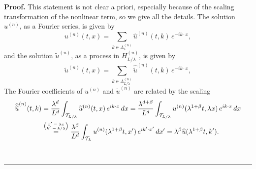 \documentclass[11pt]{preprint}
\newenvironment{proof}[1][Proof]{\textbf{#1.} }{\ \rule{0.5em}{0.5em}}
\begin{document}
\begin{proof}
This statement is not clear a priori, especially because of the scaling
transformation of the nonlinear term, so we give all the details.
The solution $u^{(n)}$, as a Fourier series, is given by
\[
u^{(n)}(t,x)=\sum_{k\in\Lambda^{(n)}_L}\widehat{u}^{(n)}(t,k)
\,e^{-i k\cdot x},
\]
and the solution $\widetilde{u}^{(n)}$, as a process in $H_{L/\lambda}^{(n)}$,
is given by
\[
\widetilde{u}^{(n)}(t,x)=\sum_{k\in\Lambda^{(n)}_{{L/\lambda}}}
\widehat{\widetilde{u}}^{(n)}(t,k)\,e^{-i k\cdot x},
\]
The Fourier coefficients of $u^{(n)}$ and $\widetilde{u}^{(n)}$ are related
by the scaling
\begin{align}\label{fourierscaling}
\widehat{\widetilde{u}}^{(n)}(t,k)
&=\frac{\lambda^d}{L^d}\int_{\mathcal{T}_{{L/\lambda}}}
  \widetilde{u}^{(n)}(t,x)\,e^{ik\cdot x}\,dx
 =\frac{\lambda^{d+\beta}}{L^d}\int_{\mathcal{T}_{{L/\lambda}}}
  u^{(n)}(\lambda^{1+\beta}t,\lambda x)\,e^{ik\cdot x}\,dx\\
&\overset{\left(\substack{\mbox{\tiny$x'=\lambda x$}\\\mbox{\tiny$k'=k/\lambda$}}\right)}{=}
  \frac{\lambda^\beta}{L^d}\int_{\mathcal{T}_L}
  u^{(n)}(\lambda^{1+\beta}t,x')\,e^{ik'\cdot x'}\,dx'
 =\lambda^\beta\widehat{u}(\lambda^{1+\beta}t,k').\notag
\end{align}

\end{proof}
\end{document}
